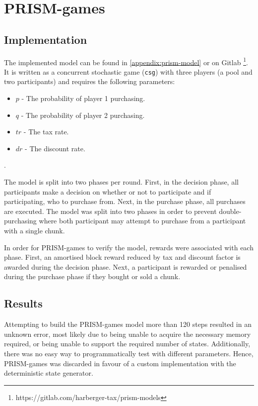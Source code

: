\section{PRISM-games} \label{section:prism-results}

\subsection{Implementation}

The implemented model can be found in \cref{appendix:prism-model} or on Gitlab \footnote{https://gitlab.com/harberger-tax/prism-models}. It is written as a concurrent stochastic game (\texttt{csg}) with three players (a pool and two participants) and requires the following parameters: 

\begin{itemize}
    \item $p$ - The probability of player 1 purchasing.
    \item $q$ - The probability of player 2 purchasing.
    \item $tr$ - The tax rate.
    \item $dr$ - The discount rate.
\end{itemize}.

The model is split into two phases per round. First, in the decision phase, all participants make a decision on whether or not to participate and if participating, who to purchase from. Next, in the purchase phase, all purchases are executed. The model was split into two phases in order to prevent double-purchasing where both participant may attempt to purchase from a participant with a single chunk.

In order for PRISM-games to verify the model, rewards were associated with each phase. First, an amortised block reward reduced by tax and discount factor is awarded during the decision phase. Next, a participant is rewarded or penalised during the purchase phase if they bought or sold a chunk.

\subsection{Results}

Attempting to build the PRISM-games model more than 120 steps resulted in an unknown error, most likely due to being unable to acquire the necessary memory required, or being unable to support the required number of states. Additionally, there was no easy way to programmatically test with different parameters. Hence, PRISM-games was discarded in favour of a custom implementation with the deterministic state generator.
